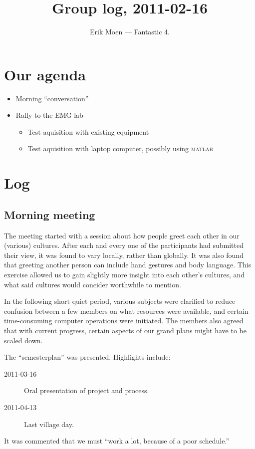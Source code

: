 \documentclass[a4paper, oneside, fleqn, halfparskip]{scrartcl}
\begin{document}
\title{Group log, 2011-02-16}
\subject{Homo Mobilis — Eksperter i Team}
\author{Erik Moen — Fantastic 4.}
\maketitle
\tableofcontents

\section{Our agenda}
\begin{itemize}
  \item Morning ``conversation''
  \item Rally to the EMG lab
  \begin{itemize}
    \item Test aquisition with existing equipment
    \item Test aquisition with laptop computer, possibly using \textsc{matlab}
  \end{itemize}
\end{itemize}

\section{Log}
\subsection{Morning meeting}
The meeting started with a session about how people greet each other in our (various) cultures. After each and every one of the participants had submitted their view, it was found to vary locally, rather than globally. It was also found that greeting another person can include hand gestures and body language. This exercise allowed us to gain slightly more insight into each other's cultures, and what said cultures would concider worthwhile to mention.

In the following short quiet period, various subjects were clarified to reduce confusion between a few members on what resources were available, and certain time-consuming computer operations were initiated. The members also agreed that with current progress, certain aspects of our grand plans might have to be scaled down.

The ``semesterplan'' was presented. Highlights include:
\begin{description}
  \item[2011-03-16] Oral presentation of project and process.
  \item[2011-04-13] Last village day.
\end{description}
It was commented that we must ``work a lot, because of a poor schedule.''
\end{document}
